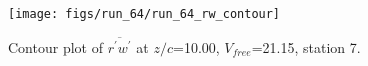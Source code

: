 \begin{figure}[H]
\centering
\texttt{[image: figs/run\_64/run\_64\_rw\_contour]}
\caption{Contour plot of $\overline{r^\prime w^\prime}$ at $z/c$=10.00, $V_{free}$=21.15, station 7.}
\label{fig:run_64_rw_contour}
\end{figure}


